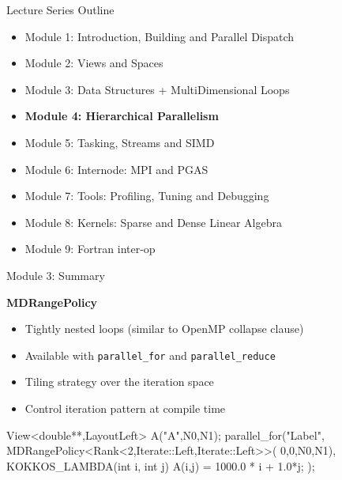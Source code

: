 \begin{frame}[fragile]{Lecture Series Outline}

\begin{itemize}
        \item Module 1: Introduction, Building and Parallel Dispatch
        \item Module 2: Views and Spaces
        \item Module 3: Data Structures + MultiDimensional Loops
        \item \textbf{Module 4: Hierarchical Parallelism}
        \item Module 5: Tasking, Streams and SIMD
        \item Module 6: Internode: MPI and PGAS
        \item Module 7: Tools: Profiling, Tuning and Debugging
        \item Module 8: Kernels: Sparse and Dense Linear Algebra
        \item Module 9: Fortran inter-op
\end{itemize}

\end{frame}

\begin{frame}[fragile]{Module 3: Summary}

	\textbf{MDRangePolicy}
        \begin{itemize}
                \item Tightly nested loops (similar to OpenMP collapse clause)
                \item Available with \texttt{parallel\_for} and \texttt{parallel\_reduce}
                \item Tiling strategy over the iteration space
                \item Control iteration pattern at compile time
        \end{itemize}

\begin{code}[keywords={double,Iterate,Left,Right,int,MDRangePolicy,Rank}]
View<double**,LayoutLeft> A("A",N0,N1);
parallel_for("Label",
  MDRangePolicy<Rank<2,Iterate::Left,Iterate::Left>>(
	{0,0},{N0,N1}),
  KOKKOS_LAMBDA(int i, int j) {
    A(i,j) = 1000.0 * i + 1.0*j;
});
\end{code}

\end{frame}

